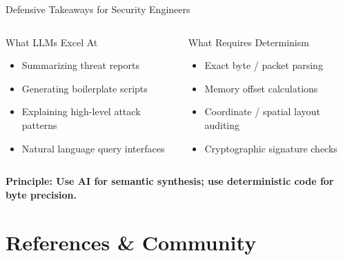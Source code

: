 \documentclass[12pt]{beamer}
\begin{document}
\begin{frame}{Defensive Takeaways for Security Engineers}
  \begin{columns}[T]
      \begin{block}{What LLMs Excel At}
        \begin{itemize}
          \item Summarizing threat reports
          \item Generating boilerplate scripts
          \item Explaining high-level attack patterns
          \item Natural language query interfaces
        \end{itemize}
      \end{block}

      \begin{alertblock}{What Requires Determinism}
        \begin{itemize}
          \item Exact byte / packet parsing
          \item Memory offset calculations
          \item Coordinate / spatial layout auditing
          \item Cryptographic signature checks
        \end{itemize}
      \end{alertblock}
  \end{columns}

  \vspace{0.3cm}
  \centering
  \small\textcolor{bulletcolor}{\textbf{Principle: Use AI for semantic synthesis; use deterministic code for byte precision.}}
\end{frame}

\section{References \& Community}
\end{document}
